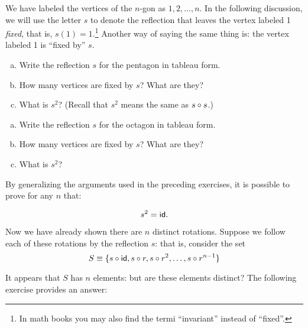 We have labeled the vertices of the $n$-gon as $1,2,\ldots,n$. In the following discussion, we will use the letter  $s$ to denote the reflection that leaves the vertex labeled 1  \emph{fixed}, that is, $s(1) = 1$.\footnote{In math books you may also find the termi ``invariant'' instead of ``fixed''.}  Another way of saying the same thing is:  the vertex labeled 1 is ``fixed by'' $s$.

\begin{exercise}{}
\begin{enumerate}[(a)]
\item
Write the reflection $s$  for the pentagon in tableau form.  
\item
How many vertices are fixed by $s$? What are they?
\item
What is $s^2$?  (Recall that $s^2$ means the same as $s \circ s$.)
\end{enumerate}
\end{exercise}

\begin{exercise}{31}
\begin{enumerate}[(a)]
\item
Write the reflection $s$ for the octagon in tableau form. 
\item
How many vertices are fixed by $s$? What are they?
\item
What is $s^2$?
\end{enumerate}
\end{exercise}

By generalizing the arguments used in the preceding exercises, it is possible to prove for any $n$ that:

$$ s^2 = {\sf{i}d}.$$

Now we have already shown there are $n$ distinct rotations. Suppose we follow each of these rotations by the reflection $s$: that is, consider the set
\[
S \equiv \{s \circ {\sf{i}d}, s \circ r, s \circ r^2,
\ldots, s \circ r^{n-1}\}
\]

It appears that $S$ has $n$ elements: but are these elements distinct? The following exercise provides an answer:

